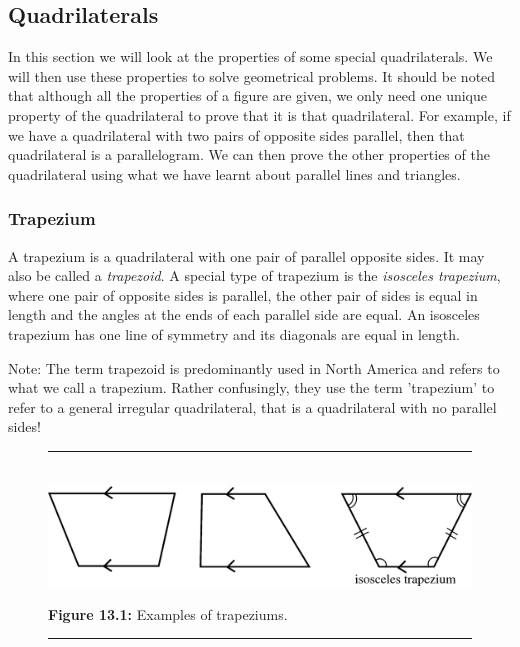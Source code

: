             \subsection{ Quadrilaterals}
            \nopagebreak
        \label{m39354*id974}In this section we will look at the properties of some special quadrilaterals. We will then use these properties to solve geometrical problems. It should be noted that although all the properties of a figure are given, we only need one unique property of the quadrilateral to prove that it is that quadrilateral. For example, if we have a quadrilateral with two pairs of opposite sides parallel, then that quadrilateral is a parallelogram. We can then prove the other properties of the quadrilateral using what we have learnt about parallel lines and triangles.\par 
        \label{m39354*uid54}
            \subsubsection{ Trapezium}
            \nopagebreak
          \label{m39354*id318803}A trapezium is a quadrilateral with one pair of parallel opposite sides. It may also be called a \textsl{trapezoid}. A special type of trapezium is the \textsl{isosceles trapezium}, where one pair of opposite sides is parallel, the other pair of sides is equal in length and the angles at the ends of each parallel side are equal. An isosceles trapezium has one line of symmetry and its diagonals are equal in length.\par 
          \label{m39354*eip-994}Note: The term trapezoid is predominantly used in North America and refers to what we call a trapezium. Rather confusingly, they use the term 'trapezium' to refer to a general irregular quadrilateral, that is a quadrilateral with no parallel sides!\par 
    \setcounter{subfigure}{0}
	\begin{figure}[H] %
    \begin{center}
    \rule[.1in]{\figurerulewidth}{.005in} \\
        \label{m39354*uid55!!!underscore!!!media}\label{m39354*uid55!!!underscore!!!printimage}\includegraphics{col11306.imgs/m39354_MG10C13_040.png} %
      \vspace{2pt}
    \vspace{\rubberspace}\par \begin{cnxcaption}
	  \small \textbf{Figure 13.1: }Examples of trapeziums.
	\end{cnxcaption}
    \vspace{.1in}
    \rule[.1in]{\figurerulewidth}{.005in} \\
    \end{center}
 \end{figure}       
        \label{m39354*uid56}
